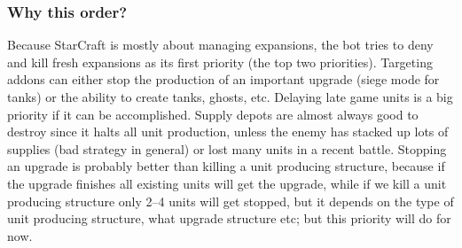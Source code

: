 \subsubsection{Why this order?}
Because StarCraft is mostly about managing expansions\cite{day9}, the bot tries to deny and kill fresh expansions as its first priority (the top two priorities). Targeting addons can either stop the production of an important upgrade (siege mode for tanks) or the ability to create tanks, ghosts, etc. Delaying late game units is a big priority if it can be accomplished. Supply depots are almost always good to destroy since it halts all unit production, unless the enemy has stacked up lots of supplies (bad strategy in general) or lost many units in a recent battle. Stopping an upgrade is probably better than killing a unit producing structure, because if the upgrade finishes all existing units will get the upgrade, while if we kill a unit producing structure only 2–4 units will get stopped, but it depends on the type of unit producing structure, what upgrade structure etc; but this priority will do for now.